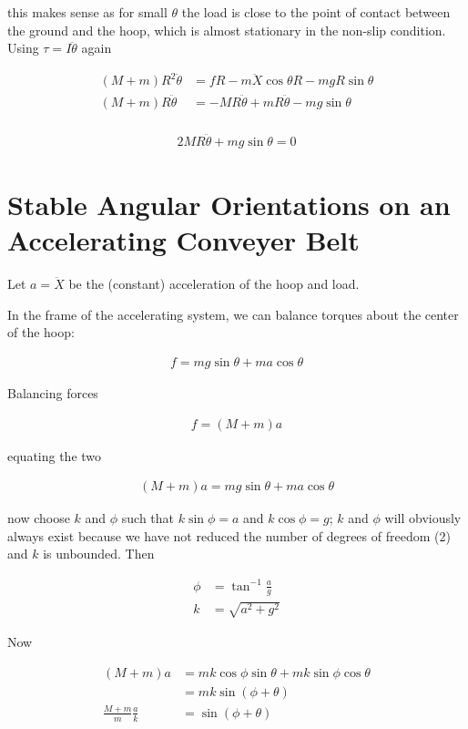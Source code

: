 \documentclass{article}
\begin{document}
this makes sense as for small $\theta$ the load is close to the point of contact between the ground and the hoop, which is almost stationary in the non-slip condition. Using $\tau = I\ddot\theta$ again

\begin{align*}
(M+m)R^2\ddot\theta &= fR - m\ddot{X}\cos\theta R - mgR\sin\theta \\
(M+m)R\ddot\theta &= -MR\ddot\theta + mR\ddot\theta - mg\sin\theta \\
\end{align*}

\begin{align*}
2MR\ddot\theta + mg\sin\theta = 0
\end{align*}

\section{Stable Angular Orientations on an Accelerating Conveyer Belt}

Let $a = \ddot{X}$ be the (constant) acceleration of the hoop and load.

In the frame of the accelerating system, we can balance torques about the center of the hoop:

\begin{align*}
f = mg\sin\theta + ma\cos\theta
\end{align*}

Balancing forces

\begin{align*}
f = (M+m)a
\end{align*}

equating the two

\begin{align*}
(M+m)a = mg\sin\theta + ma\cos\theta
\end{align*}

now choose $k$ and $\phi$ such that $k\sin\phi = a$ and $k\cos\phi = g$; $k$ and $\phi$ will obviously always exist because we have not reduced the number of degrees of freedom (2) and $k$ is unbounded. Then

\begin{align*}
\phi &= \tan^{-1}{\frac{a}{g}} \\
k &= \sqrt{a^2 + g^2}
\end{align*}

Now

\begin{align*}
(M+m)a &= mk\cos\phi\sin\theta + mk\sin\phi\cos\theta \\
&= mk\sin(\phi + \theta) \\
\frac{M+m}{m}\frac{a}{k} &= \sin(\phi + \theta)
\end{align*}
\end{document}
